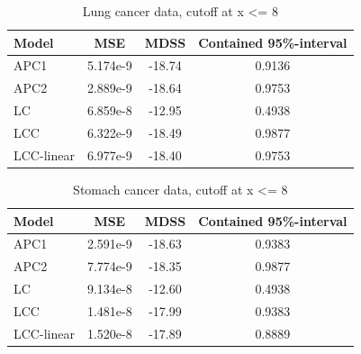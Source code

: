 \begin{table}[h!]
    \begin{center}
        \begin{tabular}{l |c c c }
            Model & MSE &   MDSS & Contained 95\%-interval\\
            \hline
            APC1    & 5.174e-9 & -18.74    & 0.9136 \\
            APC2    & 2.889e-9 & -18.64    & 0.9753 \\
            LC         & 6.859e-8 & -12.95    & 0.4938 \\
            LCC        & 6.322e-9 & -18.49    & 0.9877 \\
            LCC-linear & 6.977e-9 & -18.40    & 0.9753 \\
        \end{tabular}
        \caption{Lung cancer data, cutoff at x <= 8}\label{tbl:uv-lung-8}
    \end{center}
\end{table}

\begin{table}[h!]
    \begin{center}
        \begin{tabular}{l |c c c }
            Model & MSE &   MDSS & Contained 95\%-interval\\
            \hline
            APC1    & 2.591e-9 & -18.63    & 0.9383 \\
            APC2    & 7.774e-9 & -18.35    & 0.9877 \\
            LC         & 9.134e-8 & -12.60    & 0.4938 \\
            LCC        & 1.481e-8 & -17.99    & 0.9383 \\ 
            LCC-linear & 1.520e-8 & -17.89    & 0.8889 \\
        \end{tabular}
        \caption{Stomach cancer data, cutoff at x <= 8}\label{tbl:uv-stomach-8}
    \end{center}
\end{table}

